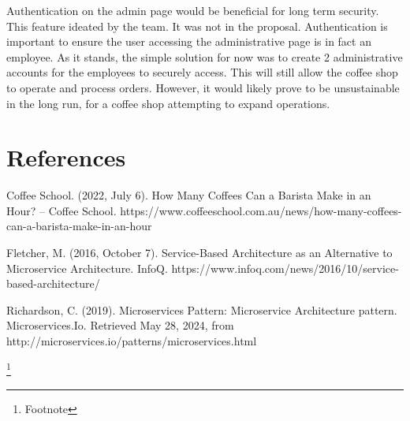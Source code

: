 \documentclass{article}
\begin{document}
\medskip \noindent Authentication on the admin page would be beneficial for long term security. This feature ideated by the team. It was not in the proposal. Authentication is important to ensure the user accessing the administrative page is in fact an employee. As it stands, the simple solution for now was to create 2 administrative accounts for the employees to securely access. This will still allow the coffee shop to operate and process orders. However, it would likely prove to be unsustainable in the long run, for a coffee shop attempting to expand operations.


\section{References}
\par \sloppy Coffee School. (2022, July 6). How Many Coffees Can a Barista Make in an Hour? – Coffee School. https://www.coffeeschool.com.au/news/how-many-coffees-can-a-barista-make-in-an-hour
\par Fletcher, M. (2016, October 7). Service-Based Architecture as an Alternative to Microservice Architecture. InfoQ. https://www.infoq.com/news/2016/10/service-based-architecture/
\par Richardson, C. (2019). Microservices Pattern: Microservice Architecture pattern. Microservices.Io. Retrieved May 28, 2024, from http://microservices.io/patterns/microservices.html

\footnote{Footnote}
\end{document}
